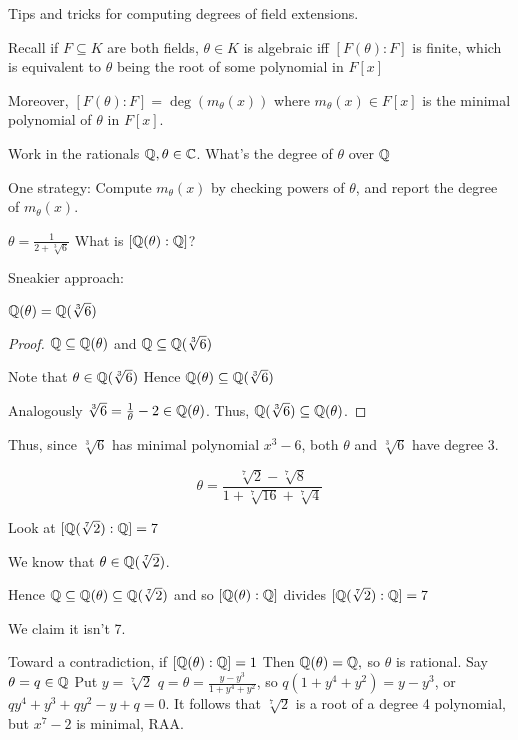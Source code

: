 \documentclass[notes.tex]{subfiles}
\begin{document}

Tips and tricks for computing degrees of field extensions.

Recall if $F\subseteq K$ are both fields, $\theta\in K$ is algebraic iff
$[F(\theta):F]$ is finite, which is equivalent to $\theta$ being the root of some polynomial in $F[x]$

Moreover, $[F(\theta):F]=\deg(m_\theta(x))$ where $m_\theta(x)\in F[x]$ is the minimal polynomial of $\theta$ in $F[x]$.

Work in the rationals $\mathbb{Q}, \theta\in \mathbb{C}$.
What's the degree of $\theta$ over $\mathbb{Q}$

One strategy: Compute $m_\theta(x)$ by checking powers of $\theta$, and report the degree of $m_\theta(x)$.

\begin{eg}
	$\theta = \frac{1}{2+\sqrt[3]{6}}$ What is $[\mathbb{Q}(\theta):\mathbb{Q}]$?

	Sneakier approach:
	\begin{claim}
		$\mathbb{Q}(\theta)=\mathbb{Q}(\sqrt[3]{6})$
	\end{claim}
	\begin{proof}
		$\mathbb{Q} \subseteq \mathbb{Q}(\theta)$ and $\mathbb{Q}\subseteq\mathbb{Q}(\sqrt[3]{6})$

		Note that $\theta \in \mathbb{Q}(\sqrt[3]{6})$
		Hence $\mathbb{Q}(\theta)\subseteq \mathbb{Q}(\sqrt[3]{6})$

		Analogously $\sqrt[3]{6} = \frac{1}{\theta}-2\in\mathbb{Q}(\theta)$. 
		Thus, $\mathbb{Q}(\sqrt[3]{6})\subseteq\mathbb{Q}(\theta)$.
	\end{proof}

	Thus, since $\sqrt[3]{6}$ has minimal polynomial $x^3-6$, both $\theta$ and $\sqrt[3]{6}$ have degree 3.
\end{eg}

\begin{eg}
	$$\theta = \frac{\sqrt[7]{2} - \sqrt[7]{8}}{1 + \sqrt[7]{16}+\sqrt[7]{4}}$$

	Look at $[\mathbb{Q}(\sqrt[7]{2}):\mathbb{Q}] = 7$

	We know that $\theta\in \mathbb{Q}(\sqrt[7]{2})$.

	Hence $\mathbb{Q}\subseteq \mathbb{Q}(\theta) \subseteq \mathbb{Q}(\sqrt[7]{2})$
	and so $[\mathbb{Q}(\theta):\mathbb{Q}]$ divides $[\mathbb{Q}(\sqrt[7]{2}):\mathbb{Q}] = 7$

	We claim it isn't 7.

	Toward a contradiction, if $[\mathbb{Q}(\theta):\mathbb{Q}] = 1$
	Then $\mathbb{Q}(\theta)=\mathbb{Q},$ so $\theta$ is rational.
	Say $\theta = q\in \mathbb{Q}$ Put $y=\sqrt[7]{2}$
	$q = \theta = \frac{y-y^3}{1+y^4+y^2}$, so $q(1+y^4+y^2) = y-y^3$, 
	or $qy^4 + y^3 + qy^2 - y + q= 0$. It follows that $\sqrt[7]{2}$ is a root of a degree 4 polynomial, but $x^7-2$ is minimal, RAA.
\end{eg}
\end{document}
